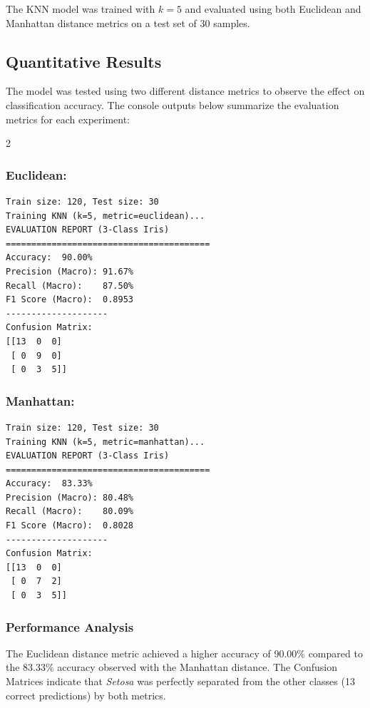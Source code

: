 \documentclass[11pt]{article}
\begin{document}
The KNN model was trained with $k=5$ and evaluated using both Euclidean and Manhattan distance metrics on a test set of 30 samples.

\subsection{Quantitative Results}
The model was tested using two different distance metrics to observe the effect on classification accuracy. The console outputs below summarize the evaluation metrics for each experiment:

\begin{multicols}{2}
    \subsubsection*{Euclidean:}
    \begin{verbatim}
Train size: 120, Test size: 30
Training KNN (k=5, metric=euclidean)...
EVALUATION REPORT (3-Class Iris)
========================================
Accuracy:  90.00%
Precision (Macro): 91.67%
Recall (Macro):    87.50%
F1 Score (Macro):  0.8953
--------------------
Confusion Matrix:
[[13  0  0]
 [ 0  9  0]
 [ 0  3  5]]
\end{verbatim}

    \subsubsection*{Manhattan:}
    \begin{verbatim}
Train size: 120, Test size: 30
Training KNN (k=5, metric=manhattan)...
EVALUATION REPORT (3-Class Iris)
========================================
Accuracy:  83.33%
Precision (Macro): 80.48%
Recall (Macro):    80.09%
F1 Score (Macro):  0.8028
--------------------
Confusion Matrix:
[[13  0  0]
 [ 0  7  2]
 [ 0  3  5]]
\end{verbatim}
\end{multicols}

\subsubsection*{Performance Analysis}
The Euclidean distance metric achieved a higher accuracy of 90.00\% compared to the 83.33\% accuracy observed with the Manhattan distance. The Confusion Matrices indicate that \textit{Setosa} was perfectly separated from the other classes (13 correct predictions) by both metrics.
\end{document}
